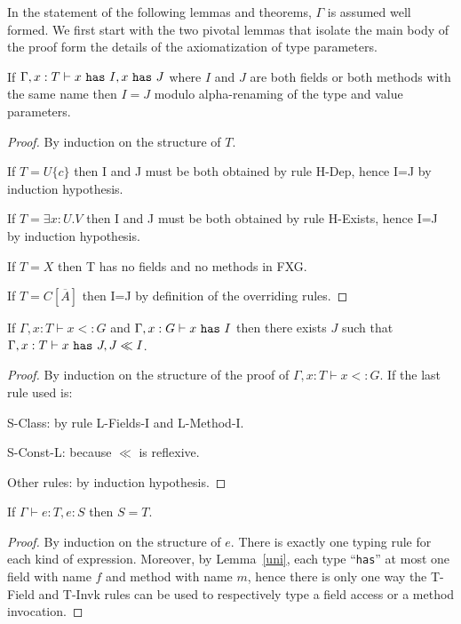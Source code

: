 In the statement of the following lemmas and theorems, $\Gamma$ is assumed well formed.
We first start with the two pivotal lemmas that isolate the main body of the proof form the details of the axiomatization of type parameters.

\begin{lem}\label{uni}
If $\Gamma,x:T\vdash x~{\tt has}~I,x~{\tt has}~J$ where $I$ and $J$ are both fields or both methods with the same name then $I=J$ modulo alpha-renaming of the type and value parameters.
\end{lem}

\begin{proof}
By induction on the structure of $T$.
\item If $T=U\{c\}$ then I and J must be both obtained by rule {\sc H-Dep}, hence I=J by induction hypothesis.
\item If $T=\exists x:U.V$ then I and J must be both obtained by rule {\sc H-Exists}, hence I=J by induction hypothesis.
\item If $T=X$ then T has no fields and no methods in FXG.
\item If $T=C[\overline{A}]$ then I=J by definition of the overriding rules.
\end{proof}


\begin{lem}\label{sum}\label{suf}
If $\Gamma,x:T\vdash x<:G$ and $\Gamma,x:G\vdash x~{\tt has}~I$ then there exists $J$ such that $\Gamma,x:T\vdash x~{\tt has}~J,J \ll I$.
\end{lem}

\begin{proof}
By induction on the structure of the proof of $\Gamma,x:T\vdash x<:G$. If the last rule used is:
\item {\sc S-Class}: by rule {\sc L-Fields-I} and {\sc L-Method-I}.
\item {\sc S-Const-L}: because $\ll$ is reflexive.
\item Other rules: by induction hypothesis.
\end{proof}

\begin{thm}\label{pri}
If $\Gamma\vdash e:T,e:S$ then $S=T$.
\end{thm}

\begin{proof}
By induction on the structure of $e$. There is exactly one typing rule for each kind of expression. Moreover, by Lemma~\ref{uni}, each type ``{\tt has}'' at most one field with name $f$ and method with name $m$, hence there is only one way the {\sc T-Field} and {\sc T-Invk} rules can be used to respectively type a field access or a method invocation.
\end{proof}

